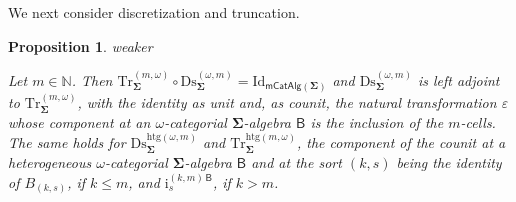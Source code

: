 \documentclass[a4paper, reqno]{amsbook}
\makeatletter
\newcommand{\sig}[1]{\mathbf{#1}}             %
\newcommand{\calg}[1]{\boldsymbol{\mathsf{#1}}} %
\newcommand{\htg}{\mathrm{htg}}                %
\newcommand{\Id}{\mathrm{Id}}
\newcommand{\Ds}{\mathrm{Ds}}
\newcommand{\Tr}{\mathrm{Tr}}
\theoremstyle{plain}
\newtheorem{proposition}[theorem]{Proposition}
\theoremstyle{definition}
\newcommand*{\CA@leanpending}{}
\newcommand*{\CA@leanrelation}{}
\newcommand*{\lean}[2]{%
  \ifcsname\string\color@lean@#1\endcsname\else
    \PackageError{main}{Unknown relation `#1' in \string\lean}{Use equivalent, weaker or stronger.}%
  \fi
  \gdef\CA@leanrelation{#1}%
  \gdef\CA@leanpending{#2}}
\makeatother
\begin{document}
We next consider discretization and truncation.

\begin{proposition}\label{PDsTrAdjOmega}\lean{weaker}{Omega.homogeneousRoundTripFunctor,Omega.homogeneousAdjunction,Omega.heterogeneousAdjunction}
Let $m\in\mathbb{N}$.
Then $\Tr^{(m,\omega)}_{\sig{\Sigma}}\circ\Ds^{(\omega,m)}_{\sig{\Sigma}}=\Id_{\mathsf{mCatAlg}(\sig{\Sigma})}$ and $\Ds^{(\omega,m)}_{\sig{\Sigma}}$ is left adjoint to $\Tr^{(m,\omega)}_{\sig{\Sigma}}$, with the identity as unit and, as counit, the natural transformation $\varepsilon$ whose component at an $\omega$-categorial $\sig{\Sigma}$-algebra $\calg{B}$ is the inclusion of the $m$-cells.
The same holds for $\Ds^{\htg(\omega,m)}_{\sig{\Sigma}}$ and $\Tr^{\htg(m,\omega)}_{\sig{\Sigma}}$, the component of the counit at a heterogeneous $\omega$-categorial $\sig{\Sigma}$-algebra $\calg{B}$ and at the sort $(k,s)$ being the identity of $B_{(k,s)}$, if $k\leq m$, and $\mathrm{i}^{(k,m)\,\calg{B}}_{s}$, if $k>m$.
\end{proposition}
\end{document}
